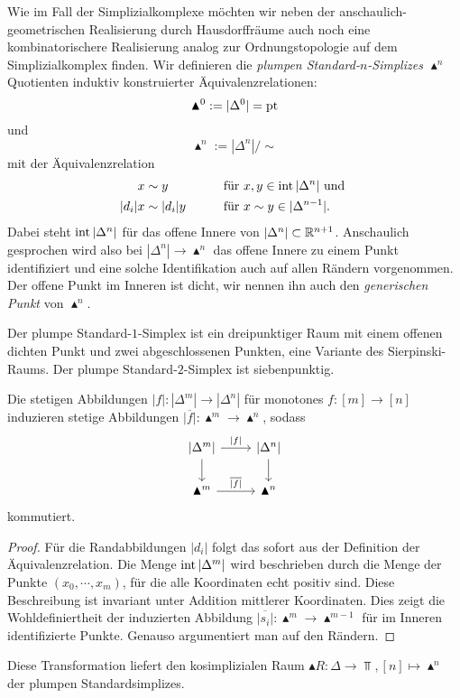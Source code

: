 \begin{bem} \label{clumsy-real}
  Wie im Fall der Simplizialkomplexe möchten wir neben der
  anschaulich-geometrischen Realisierung durch Hausdorffräume auch
  noch eine kombinatorischere Realisierung analog zur
  Ordnungstopologie auf dem Simplizialkomplex finden. Wir definieren
  die \emph{plumpen Standard-$n$-Simplizes $\blacktriangle^n$}
  Quotienten induktiv konstruierter Äquivalenzrelationen:
  \[ \blacktriangle^0 := |\Delta^0| = \operatorname{pt} \]
  und
  \[ \blacktriangle^n := |\Delta^n| / \sim \]
  mit der Äquivalenzrelation
  \begin{alignat*}{3}
    x &\sim y && \qquad \text{für } x, y \in \operatorname{int} |\Delta^n| \text{ und }  \\
    |d_i| x &\sim |d_i| y && \qquad \text{für } x \sim y \in |\Delta^{n-1}|.
  \end{alignat*}
  Dabei steht $\operatorname{int} |\Delta^n|$ für das offene Innere von $|\Delta^n|
  \subset \mathbb{R}^{n+1}$. Anschaulich gesprochen wird also bei $|\Delta^n|
  \to \blacktriangle^n$ das offene Innere zu einem Punkt identifiziert
  und eine solche Identifikation auch auf allen Rändern
  vorgenommen. Der offene Punkt im Inneren ist dicht, wir nennen ihn
  auch den \emph{generischen Punkt} von $\blacktriangle^n$.
\end{bem}
\begin{bsp}
  Der plumpe Standard-$1$-Simplex ist ein dreipunktiger Raum mit einem
  offenen dichten Punkt und zwei abgeschlossenen Punkten, eine
  Variante des Sierpinski-Raums. Der plumpe Standard-$2$-Simplex ist
  siebenpunktig.
\end{bsp}
\begin{lemma}
  Die stetigen Abbildungen $|f|: |\Delta^m| \to |\Delta^n|$ für
  monotones $f: [m] \to [n]$ induzieren stetige Abbildungen
  $\overline{|f|}: \blacktriangle^m \to \blacktriangle^n$, sodass
  \[ \begin{tikzcd}
    \lvert \Delta^m \rvert \arrow{d} \arrow{r}{|f|}
    & \lvert \Delta^n \rvert \arrow{d} \\
    \blacktriangle^m \arrow{r}{\overline{|f|}}
    & \blacktriangle^n
  \end{tikzcd} \]
  kommutiert.
\end{lemma}
\begin{proof}
  Für die Randabbildungen $|d_i|$ folgt das sofort aus der Definition
  der Äquivalenzrelation. Die Menge $\operatorname{int} |\Delta^m|$ wird
  beschrieben durch die Menge der Punkte $(x_0, \cdots, x_m)$, für die
  alle Koordinaten echt positiv sind. Diese Beschreibung ist invariant
  unter Addition mittlerer Koordinaten. Dies zeigt die
  Wohldefiniertheit der induzierten Abbildung $\overline{|s_i|}:
  \blacktriangle^m \to \blacktriangle^{m-1}$ für im Inneren
  identifizierte Punkte. Genauso argumentiert man auf den Rändern.
\end{proof}
Diese Transformation liefert den kosimplizialen Raum $\blacktriangle
R: \Delta \to \Top, [n] \mapsto \blacktriangle^n$ der plumpen
Standardsimplizes.

